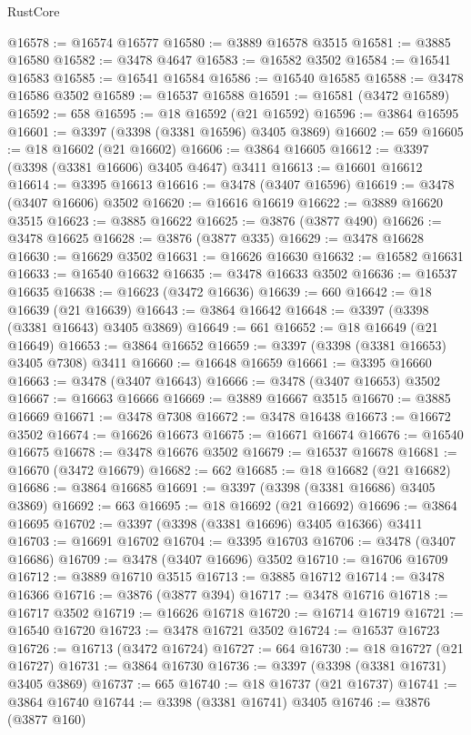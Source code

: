\begin{lexlean}{RustCore}
\begin{coremodule}
@16578 := @16574 @16577
@16580 := @3889 @16578 @3515
@16581 := @3885 @16580
@16582 := @3478 @4647
@16583 := @16582 @3502
@16584 := @16541 @16583
@16585 := @16541 @16584
@16586 := @16540 @16585
@16588 := @3478 @16586 @3502
@16589 := @16537 @16588
@16591 := @16581 (@3472 @16589)
@16592 := 658
@16595 := @18 @16592 (@21 @16592)
@16596 := @3864 @16595
@16601 := @3397 (@3398 (@3381 @16596) @3405 @3869)
@16602 := 659
@16605 := @18 @16602 (@21 @16602)
@16606 := @3864 @16605
@16612 := @3397 (@3398 (@3381 @16606) @3405 @4647) @3411
@16613 := @16601 @16612
@16614 := @3395 @16613
@16616 := @3478 (@3407 @16596)
@16619 := @3478 (@3407 @16606) @3502
@16620 := @16616 @16619
@16622 := @3889 @16620 @3515
@16623 := @3885 @16622
@16625 := @3876 (@3877 @490)
@16626 := @3478 @16625
@16628 := @3876 (@3877 @335)
@16629 := @3478 @16628
@16630 := @16629 @3502
@16631 := @16626 @16630
@16632 := @16582 @16631
@16633 := @16540 @16632
@16635 := @3478 @16633 @3502
@16636 := @16537 @16635
@16638 := @16623 (@3472 @16636)
@16639 := 660
@16642 := @18 @16639 (@21 @16639)
@16643 := @3864 @16642
@16648 := @3397 (@3398 (@3381 @16643) @3405 @3869)
@16649 := 661
@16652 := @18 @16649 (@21 @16649)
@16653 := @3864 @16652
@16659 := @3397 (@3398 (@3381 @16653) @3405 @7308) @3411
@16660 := @16648 @16659
@16661 := @3395 @16660
@16663 := @3478 (@3407 @16643)
@16666 := @3478 (@3407 @16653) @3502
@16667 := @16663 @16666
@16669 := @3889 @16667 @3515
@16670 := @3885 @16669
@16671 := @3478 @7308
@16672 := @3478 @16438
@16673 := @16672 @3502
@16674 := @16626 @16673
@16675 := @16671 @16674
@16676 := @16540 @16675
@16678 := @3478 @16676 @3502
@16679 := @16537 @16678
@16681 := @16670 (@3472 @16679)
@16682 := 662
@16685 := @18 @16682 (@21 @16682)
@16686 := @3864 @16685
@16691 := @3397 (@3398 (@3381 @16686) @3405 @3869)
@16692 := 663
@16695 := @18 @16692 (@21 @16692)
@16696 := @3864 @16695
@16702 := @3397 (@3398 (@3381 @16696) @3405 @16366) @3411
@16703 := @16691 @16702
@16704 := @3395 @16703
@16706 := @3478 (@3407 @16686)
@16709 := @3478 (@3407 @16696) @3502
@16710 := @16706 @16709
@16712 := @3889 @16710 @3515
@16713 := @3885 @16712
@16714 := @3478 @16366
@16716 := @3876 (@3877 @394)
@16717 := @3478 @16716
@16718 := @16717 @3502
@16719 := @16626 @16718
@16720 := @16714 @16719
@16721 := @16540 @16720
@16723 := @3478 @16721 @3502
@16724 := @16537 @16723
@16726 := @16713 (@3472 @16724)
@16727 := 664
@16730 := @18 @16727 (@21 @16727)
@16731 := @3864 @16730
@16736 := @3397 (@3398 (@3381 @16731) @3405 @3869)
@16737 := 665
@16740 := @18 @16737 (@21 @16737)
@16741 := @3864 @16740
@16744 := @3398 (@3381 @16741) @3405
@16746 := @3876 (@3877 @160)

\end{coremodule}
\end{lexlean}
